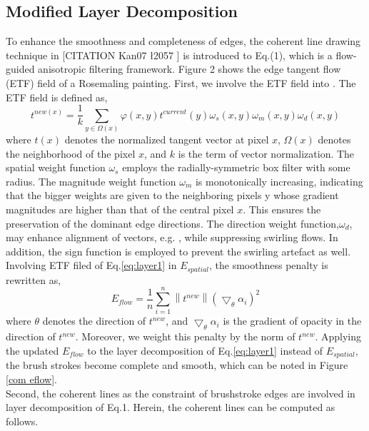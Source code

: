 \subsection{Modified Layer Decomposition}
To enhance the smoothness and completeness of edges, the coherent line drawing technique in [CITATION Kan07 \l 2057 ] is introduced to Eq.(1), which is a ﬂow-guided anisotropic ﬁltering framework. Figure 2 shows the edge tangent flow (ETF) field of a Rosemaling painting. First, we involve the ETF field into . The ETF field is defined as,
\begin{equation}
t^{new(x)}=\frac{1}{k}\sum_{y\in\Omega(x)} \varphi(x,y)t^{current}(y)\omega_{s}(x,y)\omega_{m}(x,y)\omega_{d}(x,y)
\label{eq:layer_etf} 
\end{equation}
where $t(x)$ denotes the normalized tangent vector at pixel $x$, $\Omega(x)$ denotes the neighborhood of the pixel $x$, and $k$ is the term of vector normalization. The spatial weight function $\omega_{s}$ employs the radially-symmetric box filter with some radius. The magnitude weight function $\omega_{m}$ is monotonically increasing, indicating that the bigger weights are given to the neighboring pixels y whose gradient magnitudes are higher than that of the central pixel $x$. This ensures the preservation of the dominant edge directions. The direction weight function,$\omega_{d}$, may enhance alignment of vectors, e.g. , while suppressing swirling flows. In addition, the sign function  is employed to prevent the swirling artefact as well.\\
Involving ETF filed of Eq.\ref{eq:layer1} in $ E_{spatial} $, the smoothness penalty is rewritten as,
\begin{equation} 
E_{flow}=\frac{1}{n} \sum_{i=1}^{n} \left \| t^{new} \right \| \left ( \bigtriangledown_{\theta}\alpha_{i} \right )^2 
\end{equation} 
where $\theta$ denotes the direction of $t^{new}$, and $ \bigtriangledown_{\theta}\alpha_{i} $ is the gradient of opacity in the direction of $t^{new}$. Moreover, we weight this penalty by the norm of $t^{new}$. Applying the updated $E_{flow}$ to the layer decomposition of Eq.\ref{eq:layer1} instead of $E_{spatial}$, the brush strokes become complete and smooth, which can be noted in Figure \ref{com eflow}.\\
Second, the coherent lines as the constraint of brushstroke edges are involved in layer decomposition of Eq.1. Herein, the coherent lines can be computed as follows.
